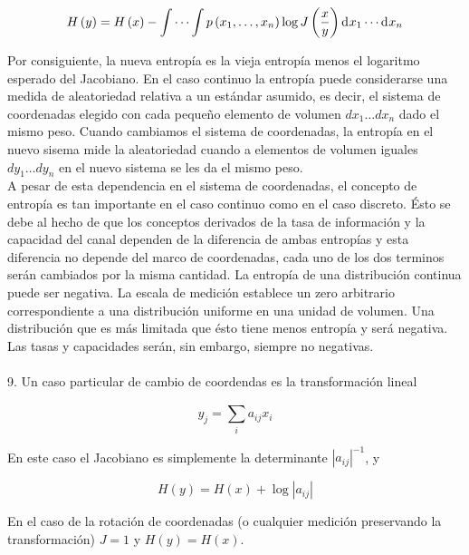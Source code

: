\begin{equation}
H\left ( y \right )=H\left ( x \right )-\int \cdots \int p\left ( x_{1}, \ldots ,x_{n} \right )\log J \left ( \frac{x}{y} \right ) \diff x _{1}\cdots  \diff x _{n}
\end{equation}

Por consiguiente, la nueva entrop\'ia es la vieja entrop\'ia menos el logaritmo esperado del Jacobiano. En el caso continuo la entrop\'ia puede considerarse una medida de aleatoriedad relativa a un est\'andar asumido, es decir, el sistema de coordenadas elegido con cada peque\~no elemento de volumen $dx_{1}\dots dx_{n}$ dado el mismo peso. Cuando cambiamos el sistema de coordenadas, la entrop\'ia en el nuevo sisema mide la aleatoriedad cuando a elementos de volumen iguales $dy_{1}\dots dy_{n}$ en el nuevo sistema se les da el mismo peso.
\\
A pesar de esta dependencia en el sistema de coordenadas, el concepto de entrop\'ia es tan importante en el caso continuo como en el caso discreto. \'Esto se debe al hecho de que los conceptos derivados de la tasa de informaci\'on y la capacidad del canal dependen de la diferencia de ambas entrop\'ias y esta diferencia no depende del marco de coordenadas, cada uno de los dos terminos ser\'an cambiados por la misma cantidad.
La entrop\'ia de una distribuci\'on continua puede ser negativa. La escala de medici\'on establece un zero arbitrario correspondiente a una distribuci\'on uniforme en una unidad de volumen. Una distribuci\'on que es m\'as limitada que \'esto tiene menos entrop\'ia y ser\'a negativa. Las tasas y capacidades ser\'an, sin embargo, siempre no negativas.
\\
\\
9. Un caso particular de cambio de coordendas es la transformaci\'on lineal

\begin{equation}
y_{j}=\sum_{i}^{\:}a_{ij}x_{i}
\end{equation}

En este caso el Jacobiano es simplemente la determinante $\left | a_{ij} \right |^{-1}$, y

\begin{equation}
H\left ( y \right )=H\left ( x \right )+\log\left | a_{ij} \right |
\end{equation}

En el caso de la rotaci\'on de coordenadas (o cualquier medici\'on preservando la transformaci\'on) $J=1$ y $H\left ( y \right ) = H\left ( x \right )$.\newline \newline

